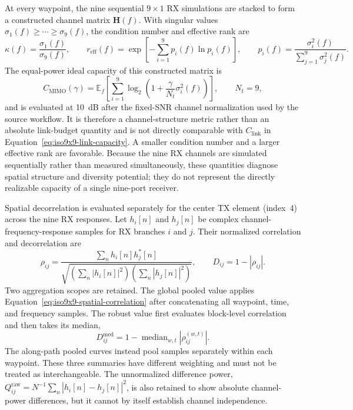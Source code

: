 At every waypoint, the nine sequential $9\times1$ RX simulations are stacked to form a constructed channel matrix $\mathbf{H}(f)$. With singular values $\sigma_1(f)\geq\cdots\geq\sigma_9(f)$, the condition number and effective rank are
\begin{equation}
    \kappa(f)=\frac{\sigma_1(f)}{\sigma_9(f)},
    \qquad
    r_\mathrm{eff}(f)=\exp\!\left[-\sum_{i=1}^{9}p_i(f)\ln p_i(f)\right],
    \qquad
    p_i(f)=\frac{\sigma_i^2(f)}{\sum_{j=1}^{9}\sigma_j^2(f)}.
    \label{eq:mc9x9-condrank}
\end{equation}
The equal-power ideal capacity of this constructed matrix is
\begin{equation}
    C_\mathrm{MIMO}(\gamma)=\mathbb{E}_f\!\left[
    \sum_{i=1}^{9}\log_2\!\left(1+\frac{\gamma}{N_t}\sigma_i^2(f)\right)
    \right],
    \qquad N_t=9,
    \label{eq:mc9x9-mimocapacity}
\end{equation}
and is evaluated at 10~dB after the fixed-SNR channel normalization used by the source workflow. It is therefore a channel-structure metric rather than an absolute link-budget quantity and is not directly comparable with $C_\mathrm{link}$ in Equation~\ref{eq:iso9x9-link-capacity}. A smaller condition number and a larger effective rank are favorable. Because the nine RX channels are simulated sequentially rather than measured simultaneously, these quantities diagnose spatial structure and diversity potential; they do not represent the directly realizable capacity of a single nine-port receiver.

Spatial decorrelation is evaluated separately for the center TX element (index~4) across the nine RX responses. Let $h_i[n]$ and $h_j[n]$ be complex channel-frequency-response samples for RX branches $i$ and $j$. Their normalized correlation and decorrelation are
\begin{equation}
    \rho_{ij}=\frac{\sum_n h_i[n]h_j^*[n]}
    {\sqrt{\left(\sum_n|h_i[n]|^2\right)\left(\sum_n|h_j[n]|^2\right)}},
    \qquad D_{ij}=1-|\rho_{ij}|.
    \label{eq:iso9x9-spatial-correlation}
\end{equation}
Two aggregation scopes are retained. The global pooled value applies Equation~\ref{eq:iso9x9-spatial-correlation} after concatenating all waypoint, time, and frequency samples. The robust value first evaluates block-level correlation and then takes its median,
\begin{equation}
    D_{ij}^{\mathrm{med}}=1-\operatorname{median}_{w,t}\!\left|\rho_{ij}^{(w,t)}\right|.
    \label{eq:iso9x9-median-decorrelation}
\end{equation}
The along-path pooled curves instead pool samples separately within each waypoint. These three summaries have different weighting and must not be treated as interchangeable. The unnormalized difference power, $Q_{ij}^{\mathrm{raw}}=N^{-1}\sum_n|h_i[n]-h_j[n]|^2$, is also retained to show absolute channel-power differences, but it cannot by itself establish channel independence.

